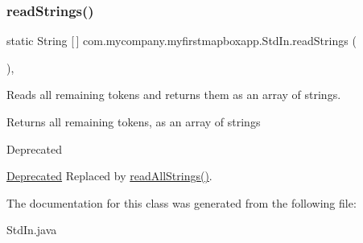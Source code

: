 \subsubsection{\texorpdfstring{read\+Strings()}{readStrings()}}
{\footnotesize\ttfamily static String \mbox{[}$\,$\mbox{]} com.\+mycompany.\+myfirstmapboxapp.\+Std\+In.\+read\+Strings (\begin{DoxyParamCaption}{ }\end{DoxyParamCaption})\hspace{0.3cm}{\ttfamily [inline]}, {\ttfamily [static]}}

Reads all remaining tokens and returns them as an array of strings. \begin{DoxyReturn}{Returns}
all remaining tokens, as an array of strings 
\end{DoxyReturn}
\begin{DoxyRefDesc}{Deprecated}
\item[\hyperlink{deprecated__deprecated000003}{Deprecated}]Replaced by \hyperlink{classcom_1_1mycompany_1_1myfirstmapboxapp_1_1_std_in_a7dc66044f2b746221de594ad33c84633}{read\+All\+Strings()}. \end{DoxyRefDesc}


The documentation for this class was generated from the following file\+:\begin{DoxyCompactItemize}
\item 
Std\+In.\+java\end{DoxyCompactItemize}
